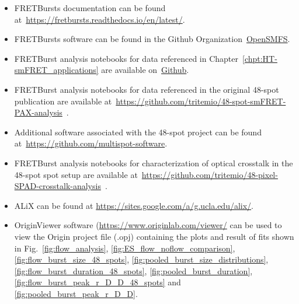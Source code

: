 \begin{itemize}
    \item FRETBursts documentation can be found at~\href{https://fretbursts.readthedocs.io/en/latest/}{https://fretbursts.readthedocs.io/en/latest/}.
    \item FRETBursts software can be found in the Github Organization~\href{https://github.com/OpenSMFS/FRETBursts}{OpenSMFS}.
    \item FRETBurst analysis notebooks for data referenced in Chapter~\ref{chpt:HT-smFRET_applications} are available on~\href{https://github.com/mayeshh/multispot_review_results}{Github}.
    \item FRETBurst analysis notebooks for data referenced in the original 48-spot publication are available at~\href{https://github.com/tritemio/48-spot-smFRET-PAX-analysis}{https://github.com/tritemio/48-spot-smFRET-PAX-analysis}~\cite{ingargiola_JCP_2018}.
    \item Additional software associated with the 48-spot project can be found at~\href{https://github.com/multispot-software}{https://github.com/multispot-software}.
    \item FRETBurst analysis notebooks for characterization of optical crosstalk in the 48-spot spot setup are available at~\href{https://github.com/tritemio/48-pixel-SPAD-crosstalk-analysis}{https://github.com/tritemio/48-pixel-SPAD-crosstalk-analysis}~\cite{ingargiola_NIMA_2018}.
    \item ALiX can be found at \href{https://sites.google.com/a/g.ucla.edu/alix/}{https://sites.google.com/a/g.ucla.edu/alix/}.
    \item OriginViewer software (\href{https://www.originlab.com/viewer/}{https://www.originlab.com/viewer/} can be used to view the Origin project file (.opj) containing the plots and result of fits shown in Fig.~\ref{fig:flow_analysis}, \ref{fig:ES_flow_noflow_comparison}, \ref{fig:flow_burst_size_48_spots}, \ref{fig:pooled_burst_size_distributions}, \ref{fig:flow_burst_duration_48_spots}, \ref{fig:pooled_burst_duration}, \ref{fig:flow_burst_peak_r_D_D_48_spots} and \ref{fig:pooled_burst_peak_r_D_D}.
\end{itemize}



